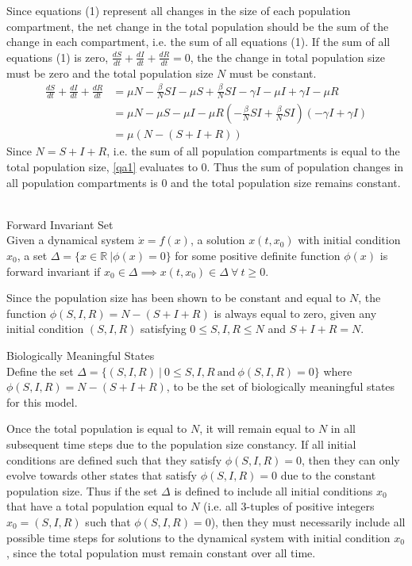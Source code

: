 Since equations (1) represent all changes in the size of each population compartment, the net change in the total population should be the sum of the change in each compartment, i.e. the sum of all equations (1).
If the sum of all equations (1) is zero, $\frac{dS}{dt} + \frac{dI}{dt} + \frac{dR}{dt} = 0$, the the change in total population size must be zero and the total population size $N$ must be constant.
\begin{align}
   \frac{dS}{dt} + \frac{dI}{dt} + \frac{dR}{dt} &= \mu N -\frac{\beta}{N} SI - \mu S + \frac{\beta}{N} SI - \gamma I - \mu I + \gamma I - \mu R\\
   &= \mu N - \mu S - \mu I - \mu R (-\frac{\beta}{N} SI + \frac{\beta}{N} SI) (- \gamma I  + \gamma I)\\
   &= \mu (N - (S + I + R)) \label{qa1}
\end{align}
Since $N = S + I + R$, i.e. the sum of all population compartments is equal to the total population size, \ref{qa1} evaluates to 0.
Thus the sum of population changes in all population compartments is 0 and the total population size remains constant.\\\\
\begin{definition}{Forward Invariant Set\\}
Given a dynamical system $\dot{x}=f(x)$, a solution $x(t,x_0)$ with initial condition $x_0$, a set $\Delta = \{x \in {\mathbb R}\ | \phi(x) = 0 \}$ for some positive definite function $\phi(x)$ is forward invariant if $x_0 \in \Delta \implies x(t,x_0) \in \Delta\ \forall\ t \geq 0$.
\end{definition}
Since the population size has been shown to be constant and equal to $N$, the function $\phi(S,I,R) = N - (S+I+R)$ is always equal to zero, given any initial condition $(S,I,R)$ satisfying $0 \leq S,I,R \leq N$ and $S+I+R = N$.
\begin{definition}{Biologically Meaningful States\\}
Define the set $\Delta = \{(S,I,R)\ |\ 0 \leq S,I,R \ \textrm{and}\ \phi(S,I,R) = 0\}$ where $\phi(S,I,R) = N - (S+I+R)$, to be the set of biologically meaningful states for this model.
\end{definition}
Once the total population is equal to $N$, it will remain equal to $N$ in all subsequent time steps due to the population size constancy.
If all initial conditions are defined such that they satisfy $\phi(S,I,R) = 0$, then they can only evolve towards other states that satisfy $\phi(S,I,R) = 0$ due to the constant population size.
Thus if the set $\Delta$ is defined to include all initial conditions $x_0$ that have a total population equal to $N$ (i.e. all 3-tuples of positive integers $x_0 = (S,I,R)$ such that $\phi(S,I,R) = 0$), then they must necessarily include all possible time steps for solutions to the dynamical system with initial condition $x_0$, since the total population must remain constant over all time.
